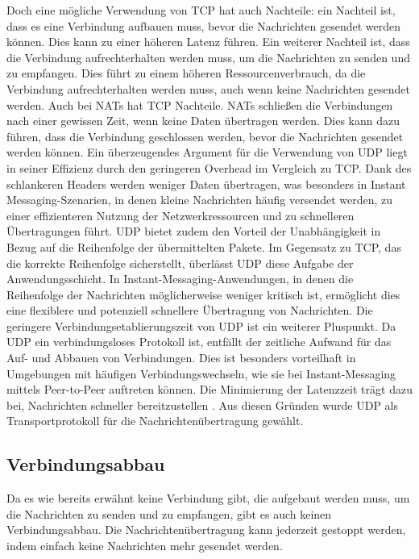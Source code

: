 Doch eine mögliche Verwendung von TCP hat auch Nachteile: ein Nachteil ist, dass es eine Verbindung aufbauen muss, bevor die Nachrichten gesendet werden können. Dies kann zu einer höheren Latenz führen. Ein weiterer Nachteil ist, dass die Verbindung aufrechterhalten werden muss, um die Nachrichten zu senden und zu empfangen. Dies führt zu einem höheren Ressourcenverbrauch, da die Verbindung aufrechterhalten werden muss, auch wenn keine Nachrichten gesendet werden. Auch bei NATs hat TCP Nachteile. NATs schließen die Verbindungen nach einer gewissen Zeit, wenn keine Daten übertragen werden. Dies kann dazu führen, dass die Verbindung geschlossen werden, bevor die Nachrichten gesendet werden können. 
Ein überzeugendes Argument für die Verwendung von UDP liegt in seiner Effizienz durch den geringeren Overhead im Vergleich zu TCP. Dank des schlankeren Headers werden weniger Daten übertragen, was besonders in Instant Messaging-Szenarien, in denen kleine Nachrichten häufig versendet werden, zu einer effizienteren Nutzung der Netzwerkressourcen und zu schnelleren Übertragungen führt. UDP bietet zudem den Vorteil der Unabhängigkeit in Bezug auf die Reihenfolge der übermittelten Pakete. Im Gegensatz zu TCP, das die korrekte Reihenfolge sicherstellt, überlässt UDP diese Aufgabe der Anwendungsschicht. In Instant-Messaging-Anwendungen, in denen die Reihenfolge der Nachrichten möglicherweise weniger kritisch ist, ermöglicht dies eine flexiblere und potenziell schnellere Übertragung von Nachrichten. Die geringere Verbindungsetablierungszeit von UDP ist ein weiterer Pluspunkt. Da UDP ein verbindungsloses Protokoll ist, entfällt der zeitliche Aufwand für das Auf- und Abbauen von Verbindungen. Dies ist besonders vorteilhaft in Umgebungen mit häufigen Verbindungswechseln, wie sie bei Instant-Messaging mittels Peer-to-Peer auftreten können. Die Minimierung der Latenzzeit trägt dazu bei, Nachrichten schneller bereitzustellen \parencites{rfc768_UDP}{rfc9293_TCP}. 
Aus diesen Gründen wurde UDP als Transportprotokoll für die Nachrichtenübertragung gewählt.


\subsection{Verbindungsabbau}

Da es wie bereits erwähnt keine Verbindung gibt, die aufgebaut werden muss, um die Nachrichten zu senden und zu empfangen, gibt es auch keinen Verbindungsabbau. Die Nachrichtenübertragung kann jederzeit gestoppt werden, indem einfach keine Nachrichten mehr gesendet werden. 